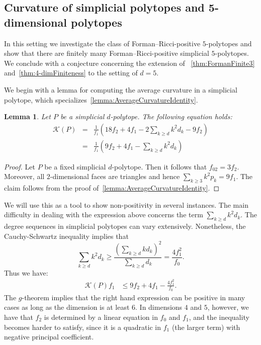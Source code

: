 \documentclass[11pt,a4paper]{amsart}
\newtheorem{lemma}[theorem]{Lemma}
\begin{document}
\subsection{Curvature of simplicial polytopes and 5-dimensional polytopes}\label{subsec:simplicial-five}

In this setting we investigate the class of Forman--Ricci-positive $5$-polytopes and show that  there are finitely many Forman--Ricci-positive simplicial $5$-polytopes. We conclude with a conjecture concerning the extension of ~\cref{thm:FormanFinite3} and~\cref{thm:4-dimFiniteness} to the setting of $d=5$.

We begin with a lemma for computing the average curvature in a simplicial polytope, which specializes~\cref{lemma:AverageCurvatureIdentity}.

\begin{lemma}\label{lemma:simplicial-AverageCurvatureIdentity}
    Let $P$ be a simplicial $d$-polytope. The following equation holds: 
    \begin{eqnarray*}
        \mathcal{K}(P) &=& \frac{1}{f_1}\left(18f_2 + 4f_1 - 2\sum_{k\ge d} k^2d_k - 9f_2\right) \\ &=& \frac{1}{f_1}\left(9f_2+4f_1-\sum_{k\ge d}k^2d_k\right)
    \end{eqnarray*}
\end{lemma}

\begin{proof}
    Let $P$ be a fixed simplicial $d$-polytope. Then it follows that $f_{02}= 3f_2$. Moreover, all $2$-dimensional faces are triangles and hence $\sum_{k\ge3}k^2p_k= 9f_1$. The claim follows from the proof of~\cref{lemma:AverageCurvatureIdentity}. 
\end{proof}

We will use this as a tool to show non-positivity in several instances. The main difficulty in dealing with the expression above concerns the term $\sum_{k\ge d}k^2d_k$. The degree sequences in simplicial polytopes can vary extensively. Nonetheless, the Cauchy-Schwartz inequality implies that 
    \begin{equation*}
        \sum_{k\ge d} k^2d_k \ge  \frac{\left(\sum_{k\ge d}kd_k\right)^2}{\sum_{k\ge d} d_k} = \frac{4f_1^2}{f_0}.
    \end{equation*}
Thus we have:
    \begin{align}\label{eqn:simplicialBound}
        \mathcal{K}(P)f_1 &\le  9f_2+4f_1 - \frac{4f_1^2}{f_0} .
    \end{align}
 The $g$-theorem implies that the right hand expression can be positive in many cases as long as the dimension is at least $6$. In dimensions $4$ and $5$, however, we have that $f_2$ is determined by a linear equation in $f_0$ and $f_1$, and the inequality becomes harder to satisfy, since it is a quadratic in $f_1$ (the larger term) with negative principal coefficient.  
\end{document}
